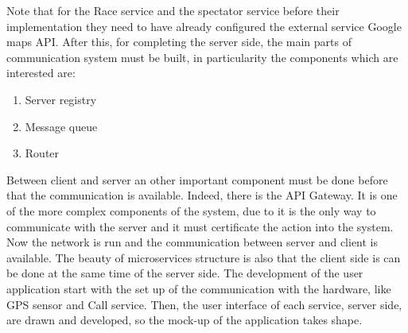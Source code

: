 Note that for the Race service and the spectator service before their implementation they need to have already configured the external service Google maps API. After this, for completing the server side, the main parts of communication system must be built, in particularity the components which are interested are: 
\begin{enumerate}
\item Server registry
\item Message queue
\item Router
\end{enumerate}
Between client and server an other important component must be done before that the communication is available. Indeed, there is the API Gateway. It is one of the more complex components of the system, due to it is the only way to communicate with the server and it must certificate the action into the system. 
Now the network is run and the communication between server and client is available.
The beauty of microservices structure is also that the client side is can be done at the same time of the server side. The development of the user application start with the set up of the communication with the hardware, like GPS sensor and Call service. Then, the user interface of each service, server side, are drawn and developed, so the mock-up of the application takes shape.